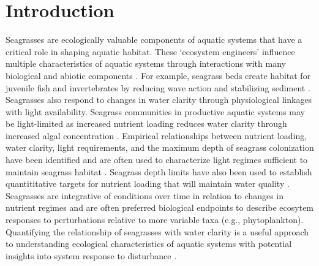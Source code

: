 \documentclass[letterpaper,12pt,oneside]{article}\usepackage[]{graphicx}\usepackage[]{color}
\begin{document}
\clearpage

\acresetall

\section{Introduction}

Seagrasses are ecologically valuable components of aquatic systems that have a critical role in shaping aquatic habitat.  These `ecosystem engineers' influence multiple characteristics of aquatic systems through interactions with many biological and abiotic components \citep{Jones94,Koch01}.  For example, seagrass beds create habitat for juvenile fish and invertebrates by reducing wave action and stabilizing sediment \citep{williams01,Hughes09}.  Seagrasses also respond to changes in water clarity through physiological linkages with light availability.  Seagrass communities in productive aquatic systems may be light-limited as increased nutrient loading reduces water clarity through increased algal concentration \citep{Duarte95}.  Empirical relationships between nutrient loading, water clarity, light requirements, and the maximum depth of seagrass colonization have been identified \citep{Duarte91,Kenworthy96,Choice14} and are often used to characterize light regimes sufficient to maintain seagrass habitat \citep{Steward05}.  Seagrass depth limits have also been used to establish quantititative targets for nutrient loading that will maintain water quality \citep{Janicki96}.  Seagrasses are integrative of conditions over time in relation to changes in nutrient regimes \citep{Duarte95} and are often preferred biological endpoints to describe ecosytem responses to perturbations relative to more variable taxa (e.g., phytoplankton).  Quantifying the relationship of seagrasses with water clarity is a useful approach to understanding ecological characteristics of aquatic systems with potential insights into system response to disturbance \citep{Greve05}.    
\end{document}
